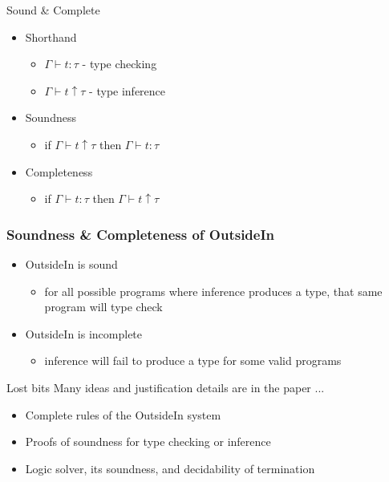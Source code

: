 \documentclass{beamer}
\begin{document}
\begin{frame}{Sound \& Complete}
\begin{itemize}
\item Shorthand
   \begin{itemize}
   \item $\Gamma \vdash t : \tau$ - type checking
   \item $\Gamma \vdash t \uparrow \tau$ - type inference
   \end{itemize}
\item Soundness
   \begin{itemize}
   \item if $\Gamma \vdash t \uparrow \tau$ then $\Gamma \vdash t : \tau$
   \end{itemize}
\item Completeness
   \begin{itemize}
   \item if $\Gamma \vdash t : \tau$ then $\Gamma \vdash t \uparrow \tau$
   \end{itemize}
\end{itemize}
\end{frame}

\begin{frame}
\frametitle{Soundness \& Completeness of OutsideIn}
\begin{itemize}
   \item OutsideIn is sound
      \begin{itemize}
         \item for all possible programs where inference produces a type, that same program will type check
      \end{itemize}
   \item OutsideIn is incomplete
      \begin{itemize}
         \item inference will fail to produce a type for some valid programs
      \end{itemize}
\end{itemize}
\end{frame}

\begin{frame}{Lost bits}
Many ideas and justification details are in the paper ...
\begin{itemize}
\item Complete rules of the OutsideIn system
\item Proofs of soundness for type checking or inference
\item Logic solver, its soundness, and decidability of termination
\end{itemize}
\end{frame}
\end{document}
